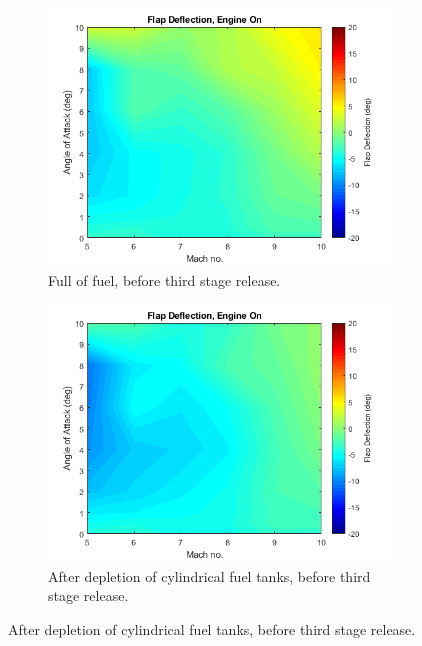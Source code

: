 		
		\begin{figure}[ht]
			\begin{subfigure}{.5\textwidth}
				\centering
				\includegraphics[width=0.99\linewidth]{figures/3_vehicle_design/FlapEngineCG1}
				\caption{Full of fuel, before third stage release.}
			\end{subfigure}
			\begin{subfigure}{.5\textwidth}
				\centering
				\includegraphics[width=0.99\linewidth]{figures/3_vehicle_design/FlapEngineCG2}
				\caption{After depletion of cylindrical fuel tanks, before third stage release.}
				

\end{subfigure}
\end{figure}
